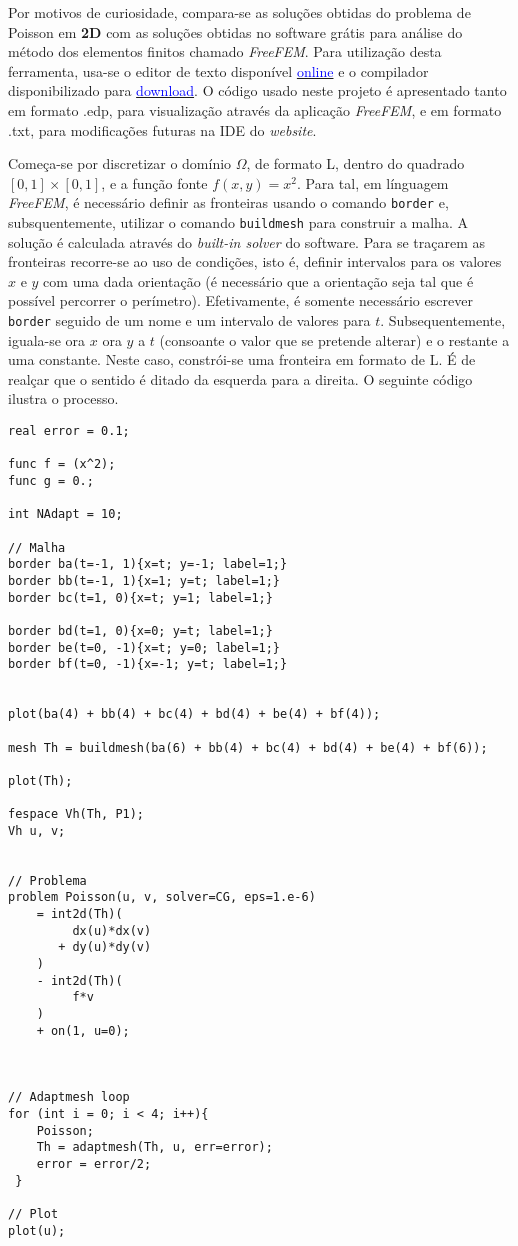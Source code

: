 \documentclass{article}
\theoremstyle{definition}
\theoremstyle{plain}
\numberwithin{equation}{section}
\newcommand{\tab}{\hspace{10mm}}
\begin{document}
\tab Por motivos de curiosidade, compara-se as soluções obtidas do problema de Poisson em \textbf{2D} com as soluções obtidas no software grátis para análise do método dos elementos finitos chamado \emph{FreeFEM}. Para utilização desta ferramenta, usa-se o editor de texto disponível \href{https://freefem.org/tryit}{\textcolor{blue}{online}} e o compilador disponibilizado para \href{https://github.com/FreeFem/FreeFem-sources/releases}{\textcolor{blue}{download}}. O código usado neste projeto é apresentado tanto em formato .edp, para visualização através da aplicação \emph{FreeFEM}, e em formato .txt, para modificações futuras na IDE do \emph{website}.

\tab Começa-se por discretizar o domínio $\Omega$, de formato L, dentro do quadrado $ [0,1] \times [0,1] $, e a função fonte $f(x,y)=x^2$. Para tal, em línguagem \emph{FreeFEM}, é necessário definir as fronteiras usando o comando \verb +border+ e, subsquentemente, utilizar o comando \verb +buildmesh+ para construir a malha. A solução é calculada através do \emph{built-in solver} do software. Para se traçarem as fronteiras recorre-se ao uso de condições, isto é, definir intervalos para os valores $x$ e $y$ com uma dada orientação (é necessário que a orientação seja tal que é possível percorrer o perímetro). Efetivamente, é somente necessário escrever \verb +border+ seguido de um nome e um intervalo de valores para $t$. Subsequentemente, iguala-se ora $x$ ora $y$ a $t$ (consoante o valor que se pretende alterar) e o restante a uma constante. Neste caso, constrói-se uma fronteira em formato de L. É de realçar que o sentido é ditado da esquerda para a direita.  O seguinte código ilustra o processo.

\vspace{5mm}

\begin{lstlisting}[frame=single]
real error = 0.1;

func f = (x^2);
func g = 0.;

int NAdapt = 10;
 
// Malha
border ba(t=-1, 1){x=t; y=-1; label=1;}
border bb(t=-1, 1){x=1; y=t; label=1;} 
border bc(t=1, 0){x=t; y=1; label=1;} 
 
border bd(t=1, 0){x=0; y=t; label=1;}
border be(t=0, -1){x=t; y=0; label=1;}
border bf(t=0, -1){x=-1; y=t; label=1;}


plot(ba(4) + bb(4) + bc(4) + bd(4) + be(4) + bf(4));

mesh Th = buildmesh(ba(6) + bb(4) + bc(4) + bd(4) + be(4) + bf(6));

plot(Th);

fespace Vh(Th, P1);
Vh u, v;
 

// Problema
problem Poisson(u, v, solver=CG, eps=1.e-6)
    = int2d(Th)(
         dx(u)*dx(v)
       + dy(u)*dy(v)
    )
    - int2d(Th)(
         f*v
    )
    + on(1, u=0);
 
 

// Adaptmesh loop
for (int i = 0; i < 4; i++){
    Poisson;
    Th = adaptmesh(Th, u, err=error);
    error = error/2;
 } 

// Plot
plot(u);
\end{lstlisting}
\end{document}
